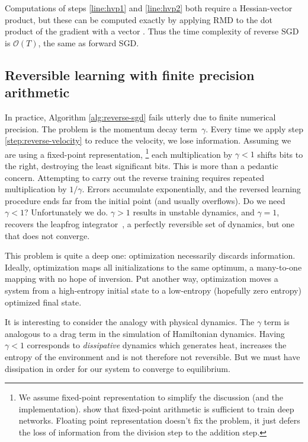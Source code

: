 \documentclass{article}
\newcommand{\decay}{\gamma}
\begin{document}
%
Computations of steps \ref{line:hvp1} and \ref{line:hvp2} both require a
Hessian-vector product, but these can be computed exactly by applying RMD to the
dot product of the gradient with a vector \citep{pearlmutter1994fast}.  Thus the
time complexity of reverse SGD is $\mathcal{O}(T)$, the same as forward SGD.

\subsection{Reversible learning with finite precision arithmetic}

In practice, Algorithm \ref{alg:reverse-sgd} fails utterly due to finite
numerical precision. The problem is the momentum decay term~$\decay$.
Every time we apply step \ref{step:reverse-velocity} to reduce the velocity, we
lose information. Assuming we are using a fixed-point representation,
\footnote{We assume fixed-point representation to simplify the discussion (and
  the implementation). 
  \citet{courbariaux2014low} show that fixed-point arithmetic is sufficient to train deep networks.
  Floating point representation doesn't fix the problem, it
  just defers the loss of information from the division step to the addition step.}
each multiplication by $\decay < 1$ shifts bits to the right, destroying the
least significant bits. This is more than a pedantic concern. Attempting to
carry out the reverse training requires repeated multiplication by $1/\decay$. 
Errors accumulate exponentially, and the reversed learning procedure ends far
from the initial point (and usually overflows). Do we need $\decay < 1$?
Unfortunately we do. $\decay > 1$ results in unstable dynamics, and
$\decay = 1$, recovers the leapfrog integrator~\citep{leapfrog1995}, a perfectly reversible set of dynamics, but one that does not converge.

This problem is quite a deep one: optimization necessarily discards information.
Ideally, optimization maps all initializations to the same optimum,
a many-to-one mapping with no hope of inversion.
Put another way, optimization moves a system from a high-entropy initial state
to a low-entropy (hopefully zero entropy) optimized final state.

It is interesting to consider the analogy with physical dynamics. The $\decay$
term is analogous to a drag term in the simulation of Hamiltonian dynamics.
Having $\decay < 1$ corresponds to \emph{dissipative} dynamics which generates
heat, increases the entropy of the environment and is not therefore not
reversible. But we must have dissipation in order for our system to converge to equilibrium.
\end{document}
